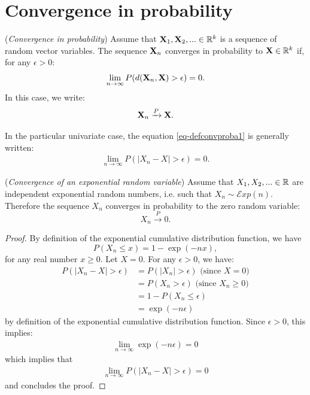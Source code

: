 \documentclass{article}
\begin{document}

\section{Convergence in probability}

\begin{definition}
\label{def-defconvproba}
(\emph{Convergence in probability})
Assume that ${\bf X}_1,{\bf X}_2,...\in\mathbb{R}^k$ is a sequence of random vector variables. 
The sequence ${\bf X}_n$ converges in probability to ${\bf X}\in\mathbb{R}^k$ if, for any $\epsilon>0$:
\begin{align}
\label{eq-defconvproba1}
\lim_{n\rightarrow \infty} P(d({\bf X}_n,{\bf X})>\epsilon)=0.
\end{align}
In this case, we write:
\begin{align}
\label{eq-defconvproba2}
{\bf X}_n \xrightarrow{P} {\bf X}.
\end{align}
\end{definition}

In the particular univariate case, the equation \ref{eq-defconvproba1} is generally written:
\begin{align}
\label{eq-defconvproba1}
\lim_{n\rightarrow \infty} P(|X_n-X|>\epsilon)=0.
\end{align}


\begin{example}
(\emph{Convergence of an exponential random variable})
Assume that $X_1,X_2,...\in\mathbb{R}$ are independent exponential random numbers, i.e. 
such that $X_n\sim \mathcal{E}xp(n)$. 
Therefore the sequence $X_n$ converges in probability to the zero random variable:
$$
X_n \xrightarrow{P} 0.
$$
\end{example}

\begin{proof}
By definition of the exponential cumulative distribution function, we have 
$$
P(X_n\leq x) = 1 - \exp(-nx),
$$
for any real number $x\geq 0$. 
Let $X=0$. 
For any $\epsilon>0$, we have:
\begin{align*}
P(|X_n-X|>\epsilon)
&= P(|X_n|>\epsilon) \textrm{ (since $X=0$)} \\
&= P(X_n>\epsilon) \textrm{ (since $X_n\geq 0$)} \\
&= 1 - P(X_n\leq \epsilon) \\
&= \exp(-n\epsilon)
\end{align*}
by definition of the exponential cumulative distribution function. 
Since $\epsilon>0$, this implies:
\begin{align*}
\lim_{n\rightarrow \infty} \exp(-n\epsilon) = 0 
\end{align*}
which implies that 
\begin{align*}
\lim_{n\rightarrow \infty} P(|X_n-X|>\epsilon) = 0 
\end{align*}
and concludes the proof.
\end{proof}
\end{document}
